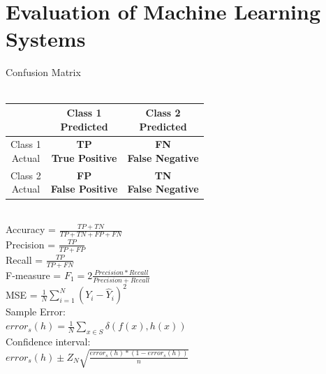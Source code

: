 \documentclass[a4paper, 10pt, twocolumn]{article}
\begin{document}
\section{Evaluation of Machine Learning Systems}
Confusion Matrix \\ \\
\begin{tabular} {| c | c | c |}
	\hline
 & \thead{Class 1 \\ Predicted} & \thead{Class 2 \\ Predicted} \\
 \hline
 \thead{Class 1 \\ Actual} &  \thead{\bf TP \\ True Positive} & \thead{\bf FN \\False Negative} \\
 \hline
 \thead{Class 2 \\ Actual} &  \thead{\bf FP \\ False Positive} & \thead{\bf TN \\ False Negative} \\
 \hline
\end{tabular} \\
Accuracy = $\frac{TP + TN}{TP + TN + FP + FN}$ \\ 
Precision = $\frac{TP}{TP + FP}$ \\
Recall = $\frac{TP}{TP + FN}$ \\
F-measure = $F_1 = 2\frac{Precision*Recall}{Precision + Recall}$\\
MSE = $\frac{1}{N} \sum^{N}_{i=1}(Y_i - \hat{Y}_i)^2$\\
Sample Error: \\$error_s(h) = \frac{1}{N} \sum_{x \in S} \delta (f(x),h(x))$\\
Confidence interval: \\ $error_s(h) \pm Z_N \sqrt{\frac{error_s(h)*(1-error_s(h))}{n}}$
\end{document}
